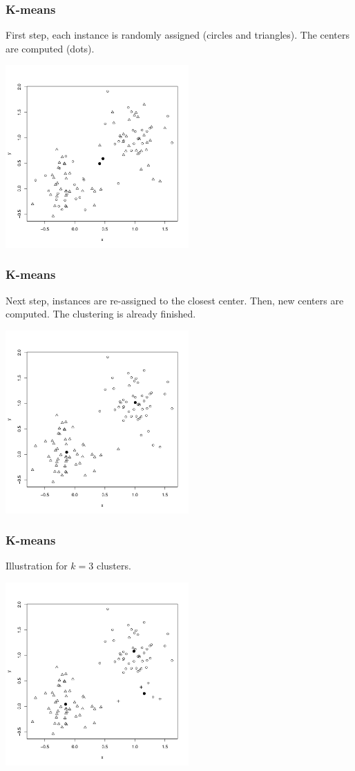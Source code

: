 \begin{frame}
\frametitle{K-means}
First step, each instance is randomly assigned (circles and triangles). The centers are computed (dots).
\begin{center}
\includegraphics[width=7cm]{../../Graphs/kmeans2.png}
\end{center}
\end{frame}
\begin{frame}
\frametitle{K-means}
Next step, instances are re-assigned to the closest center. Then, new centers are computed. The clustering is already finished.
\begin{center}
\includegraphics[width=7cm]{../../Graphs/kmeans3.png}
\end{center}
\end{frame}
\begin{frame}
\frametitle{K-means}
Illustration for $k=3$ clusters.
\begin{center}
\includegraphics[width=7cm]{../../Graphs/kmeans4.png}
\end{center}
\end{frame}
